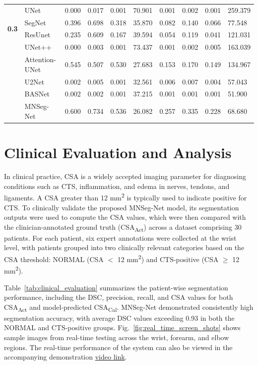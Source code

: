 \begin{table}[htbp]
{\begin{tabular}{clllllllll}
\hline 
\multirow{4}{*}{\textbf{0.3}}        
& UNet            & 0.000 & 0.017 & 0.001 & 70.901 & 0.001 & 0.002 & 0.001 & 259.379 \\
& SegNet          & 0.396 & 0.698 & 0.318 & 35.870 & 0.082 & 0.140 & 0.066 & 77.548 \\
& ResUnet         & 0.235 & 0.609 & 0.167 & 39.594 & 0.054 & 0.119 & 0.041 & 121.031 \\
& UNet++          & 0.000 & 0.003 & 0.001 & 73.437 & 0.001 & 0.002 & 0.005 & 163.039 \\
& Attention-UNet  & 0.545 & 0.507 & 0.530 & 27.683 & 0.153 & 0.170 & 0.149 & 134.967 \\
& U2Net           & 0.002 & 0.005 & 0.001 & 32.561 & 0.006 & 0.007 & 0.004 & 57.043 \\
& BASNet          & 0.002 & 0.002 & 0.001 & 37.215 & 0.001 & 0.001 & 0.001 & 51.900 \\
& MNSeg-Net       & 0.600 & 0.734 & 0.536 & 26.082 & 0.257 & 0.335 & 0.228 & 68.680 \\

\hline 

\end{tabular}}
\label{tab:input_pertubation_analysis}
\end{table}





\section{Clinical Evaluation and Analysis}
In clinical practice, CSA is a widely accepted imaging parameter for diagnosing conditions such as CTS, inflammation, and edema in nerves, tendons, and ligaments. A CSA greater than 12 mm\textsuperscript{2} is typically used to indicate positive for CTS\cite{ghasemi2017determination,nkrumah2020ultrasonography,falsetti2022novel}. To clinically validate the proposed MNSeg-Net model, its segmentation outputs were used to compute the CSA values, which were then compared with the clinician-annotated ground truth (CSA\textsubscript{Act}) across a dataset comprising 30 patients. For each patient, six expert annotations were collected at the wrist level, with patients grouped into two clinically relevant categories based on the CSA threshold: NORMAL (CSA $<$ 12 mm\textsuperscript{2}) and CTS-positive (CSA $\geq$ 12 mm\textsuperscript{2}).


Table~\ref{tab:clinical_evaluation} summarizes the patient-wise segmentation performance, including the DSC, precision, recall, and CSA values for both CSA\textsubscript{Act} and model-predicted CSA\textsubscript{Cal}. MNSeg-Net demonstrated consistently high segmentation accuracy, with average DSC values exceeding 0.93 in both the NORMAL and CTS-positive groups. Fig.~\ref{fig:real_time_screen_shots} shows sample images from real-time testing across the wrist, forearm, and elbow regions. The real-time performance of the system can also be viewed in the accompanying demonstration \href{https://drive.google.com/file/d/1Rh21EY4dzHCAJtpvVj-OqgsAGnHDZDee/view?usp=sharing}{video link}.

